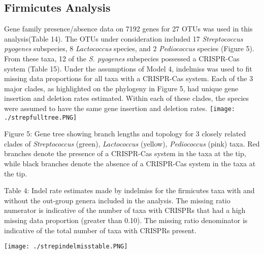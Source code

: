\documentclass[english]{article}
\begin{document}
\subsection{Firmicutes Analysis}

Gene family presence/absence data on 7192 genes for 27 OTUs was used
in this analysis(Table 14).  The OTUs under consideration included 17
\textit{Streptococcus pyogenes} subspecies, 8 \textit{Lactococcus} species, and 2
\textit{Pediococcus} species (Figure 5). From these taxa, 12 of the
\textit{S. pyogenes}
subspecies possessed a CRISPR-Cas system (Table 15).  Under the
assumptions of Model 4, indelmiss was used to fit missing data
proportions for all taxa with a CRISPR-Cas system.  Each of the 3
major clades, as highlighted on the phylogeny in Figure 5, had unique
gene insertion and deletion rates estimated.   Within each of these
clades, the species were assumed to have the same gene insertion and
deletion rates. 
\singlespacing
\texttt{[image: ./strepfulltree.PNG]}
\caption{Figure 5: Gene tree showing branch lengths and topology for 3
closely related clades of \textit{Streptococcus} (green),
\textit{Lactococcus} (yellow),
\textit{Pediococcus} (pink) taxa. Red branches denote the presence of
a CRISPR-Cas system in the taxa at the tip, while black branches
denote the absence of a CRISPR-Cas system in the taxa at the tip.}
\singlespacing
\caption{Table 4: Indel rate estimates made by indelmiss for the
firmicutes taxa with and without the out-group genera included in the
analysis. The missing ratio numerator is indicative of the number of
taxa with CRISPRs that had a high missing data proportion (greater
than 0.10).  The missing ratio denominator is indicative of the total
number of taxa with CRISPRs present.}
\newline
\texttt{[image: ./strepindelmisstable.PNG]}
\singlespacing
\end{document}
